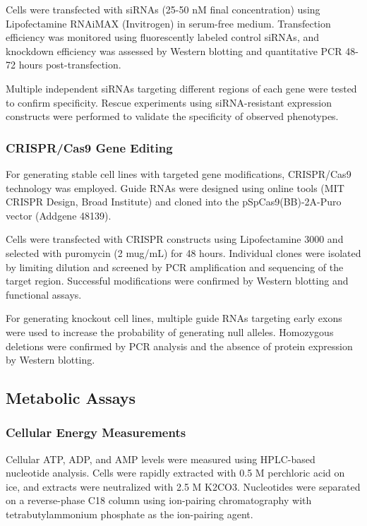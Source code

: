 \documentclass[11pt,a4paper]{article}
\begin{document}
Cells were transfected with siRNAs (25-50 nM final concentration) using Lipofectamine RNAiMAX (Invitrogen) in serum-free medium. Transfection efficiency was monitored using fluorescently labeled control siRNAs, and knockdown efficiency was assessed by Western blotting and quantitative PCR 48-72 hours post-transfection.

Multiple independent siRNAs targeting different regions of each gene were tested to confirm specificity. Rescue experiments using siRNA-resistant expression constructs were performed to validate the specificity of observed phenotypes.

\subsubsection{CRISPR/Cas9 Gene Editing}

For generating stable cell lines with targeted gene modifications, CRISPR/Cas9 technology was employed. Guide RNAs were designed using online tools (MIT CRISPR Design, Broad Institute) and cloned into the pSpCas9(BB)-2A-Puro vector (Addgene 48139).

Cells were transfected with CRISPR constructs using Lipofectamine 3000 and selected with puromycin (2 mug/mL) for 48 hours. Individual clones were isolated by limiting dilution and screened by PCR amplification and sequencing of the target region. Successful modifications were confirmed by Western blotting and functional assays.

For generating knockout cell lines, multiple guide RNAs targeting early exons were used to increase the probability of generating null alleles. Homozygous deletions were confirmed by PCR analysis and the absence of protein expression by Western blotting.

\subsection{Metabolic Assays}

\subsubsection{Cellular Energy Measurements}

Cellular ATP, ADP, and AMP levels were measured using HPLC-based nucleotide analysis. Cells were rapidly extracted with 0.5 M perchloric acid on ice, and extracts were neutralized with 2.5 M K2CO3. Nucleotides were separated on a reverse-phase C18 column using ion-pairing chromatography with tetrabutylammonium phosphate as the ion-pairing agent.
\end{document}
